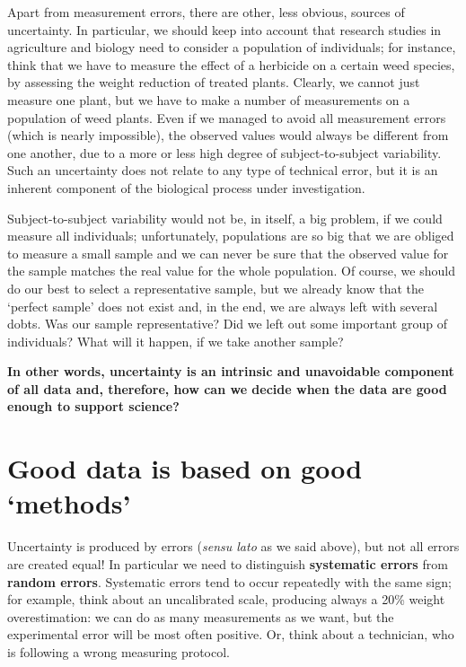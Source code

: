 \documentclass[a4paper,12pt,oneside]{book}
\begin{document}
Apart from measurement errors, there are other, less obvious, sources of uncertainty. In particular, we should keep into account that research studies in agriculture and biology need to consider a population of individuals; for instance, think that we have to measure the effect of a herbicide on a certain weed species, by assessing the weight reduction of treated plants. Clearly, we cannot just measure one plant, but we have to make a number of measurements on a population of weed plants. Even if we managed to avoid all measurement errors (which is nearly impossible), the observed values would always be different from one another, due to a more or less high degree of subject-to-subject variability. Such an uncertainty does not relate to any type of technical error, but it is an inherent component of the biological process under investigation.

Subject-to-subject variability would not be, in itself, a big problem, if we could measure all individuals; unfortunately, populations are so big that we are obliged to measure a small sample and we can never be sure that the observed value for the sample matches the real value for the whole population. Of course, we should do our best to select a representative sample, but we already know that the `perfect sample' does not exist and, in the end, we are always left with several dobts. Was our sample representative? Did we left out some important group of individuals? What will it happen, if we take another sample?

\textbf{In other words, uncertainty is an intrinsic and unavoidable component of all data and, therefore, how can we decide when the data are good enough to support science?}

\hypertarget{good-data-is-based-on-good-methods}{%
\section{Good data is based on good `methods'}\label{good-data-is-based-on-good-methods}}

Uncertainty is produced by errors (\emph{sensu lato} as we said above), but not all errors are created equal! In particular we need to distinguish \textbf{systematic errors} from \textbf{random errors}. Systematic errors tend to occur repeatedly with the same sign; for example, think about an uncalibrated scale, producing always a 20\% weight overestimation: we can do as many measurements as we want, but the experimental error will be most often positive. Or, think about a technician, who is following a wrong measuring protocol.
\end{document}
